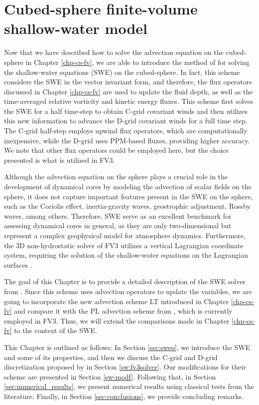 \chapter{Cubed-sphere finite-volume shallow-water model}
\label{chp-cs-swm}

Now that we have described how to solve the advection equation on the cubed-sphere in Chapter \ref{chp-cs-fv},
we are able to introduce the method of \citet{lin:1997} for solving the shallow-water equations (SWE) on the cubed-sphere.
In fact, this scheme considers the SWE in the vector invariant form, and therefore, 
the flux operators discussed in Chapter \ref{chp-cs-fv} are used to update the fluid depth,
as well as the time-averaged relative vorticity and kinetic energy fluxes.
This scheme first solves the SWE for a half time-step to obtain  C-grid covariant winds and 
then utilizes this new information to advance the  D-grid covariant winds for a full time step.
The C-grid half-step employs upwind flux operators, which are computationally inexpensive, 
while the D-grid uses PPM-based fluxes, providing higher accuracy. 
We note that other flux operators could be employed here, but the choice presented is what is utilized in FV3.

Although the advection equation on the sphere plays a crucial role in the development of dynamical cores by modeling the advection of scalar fields on the sphere, 
it does not capture important features present in the SWE on the sphere, 
such as the Coriolis effect, inertia-gravity waves, geostrophic adjustment, Rossby waves, among others. 
Therefore, SWE serve as an excellent benchmark for assessing dynamical cores in general,
as they are only two-dimensional but represent a complex geophysical model for atmosphere dynamics.
Furthermore, the 3D non-hydrostatic solver of FV3 utilizes a vertical Lagrangian coordinate system,
requiring the solution of the shallow-water equations on the Lagrangian surfaces \citep{lin:2004, harris:2021}.

The goal of this Chapter is to provide a detailed description of the SWE solver from \citet{lin:1997}.
Since this scheme uses advection operators to update the variables, 
we are going to incorporate the new advection scheme LT introduced in Chapter \ref{chp-cs-fv} and compare it with the PL advection scheme from \citet{putman:2007},
which is currently employed in FV3. 
Thus, we will extend the comparisons made in Chapter \ref{chp-cs-fv} to the context of the SWE.

This Chapter is outlined as follows:
In Section \ref{sec:sweq}, we introduce the SWE and some of its properties, and then we discuss
the C-grid and D-grid discretization proposed by \citet{lin:1997} in Section \ref{sw:fv3solver}.
Our modifications for their scheme are presented in Section \ref{sw-modf}.
Following that, in Section \ref{sec:numerical_results}, 
we present numerical results using classical tests from the literature. 
Finally, in Section \ref{sec:conclusions}, we provide concluding remarks.

